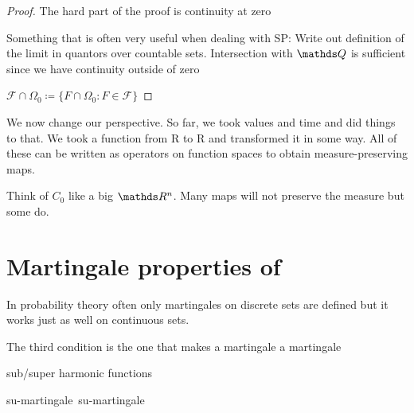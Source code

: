 \begin{prop}
\end{prop}
\begin{proof}
	The hard part of the proof is continuity at zero

	Something that is often very useful when dealing with SP:
	Write out definition of the limit in quantors over countable sets.
	Intersection with \(\Q\) is sufficient
	since we have continuity outside of zero %

	\(\mathcal F \cap \Omega_0 \coloneqq \{F \cap \Omega_0 : F \in \mathcal F\}\)
\end{proof}

We now change our perspective.
So far, we took values and time and did things to that.
We took a function from R to R and transformed it in some way.
All of these can be written as operators on function spaces
to obtain measure-preserving maps.

\begin{bem}
\end{bem}

Think of \(C_0\) like a big \(\R^n\).
Many maps will not preserve the measure but some do.

\section{Martingale properties of \BM}

In probability theory often only martingales on discrete sets are defined
but it works just as well on continuous sets.

\begin{defi}
	The third condition is the one that makes a martingale a martingale

	sub/super harmonic functions

	\def\bup{\sffamily b\hspace*{-7.6pt}\raisebox{3pt}{\(\uparrow\)}}
	\def\pdown{\sffamily p\hspace*{-7.6pt}\raisebox{-3pt}{\(\downarrow\)}}
	\def\submart{\textsf{su\rlap{\bup}\phantom{b}-martingale}}
	\def\supmart{\textsf{su\rlap{\pdown}\phantom{p}-martingale}}
	\submart\ \supmart
\end{defi}
